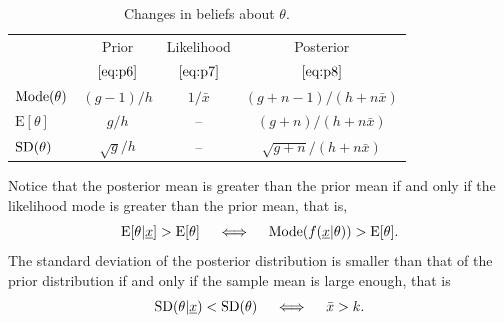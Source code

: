 {\begin{table}[!h]
\begin{tabular}{|l|c|c|c|}
\cline{2-4}
\multicolumn{1}{c|}{~}& Prior & Likelihood & Posterior \\
\multicolumn{1}{c|}{~}& $\eqref{eq:p6}$ & $\eqref{eq:p7}$ & $\eqref{eq:p8}$ \\
\hline
$\textnormal{Mode}(\theta)$ & $(g-1)/h$ & $1/\bar x$ & $(g+n-1)/(h+n\bar x)$ \\
$\text{E}[\theta]$ & $g/h$ & -- & $(g+n)/(h+n\bar x)$ \\
$\textnormal{SD}(\theta)$ & $\sqrt{g}/h$ & -- & $\sqrt{g+n}/(h+n\bar x)$ \\
\hline
\end{tabular}
\caption{Changes in beliefs about $\theta$.}
\label{tab:gam}

\end{table}
Notice that the posterior mean is greater than the prior mean if and only if the likelihood mode is greater than the prior mean, that is,
\begin{equation*}
\text{E}[\theta|\underline{x}]>\text{E}[\theta]\quad\iff\quad 
\textnormal{Mode}(f(\underline{x}|\theta))>\text{E}[\theta].
\end{equation*}
The standard deviation of the posterior distribution is smaller than that of the prior distribution if and only if the sample mean is large enough, that is
$$
\textnormal{SD}(\theta|\underline{x})<\textnormal{SD}(\theta)\quad\iff\quad \bar x > k.
$$}

\clearpage

